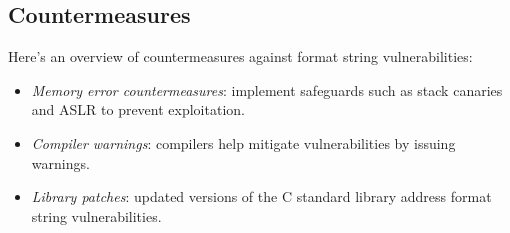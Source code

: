\subsection{Countermeasures}
Here's an overview of countermeasures against format string vulnerabilities:
\begin{itemize}
    \item \textit{Memory error countermeasures}: implement safeguards such as stack canaries and ASLR to prevent exploitation.
    \item \textit{Compiler warnings}: compilers help mitigate vulnerabilities by issuing warnings.
    \item \textit{Library patches}: updated versions of the C standard library address format string vulnerabilities.
\end{itemize}